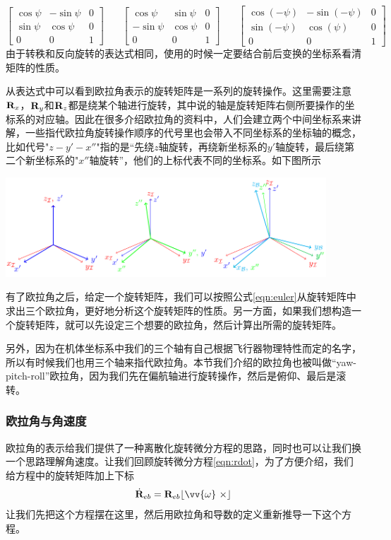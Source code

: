 \documentclass[11pt]{article}
\begin{document}
$$
\begin{bmatrix}
\cos\psi & - \sin\psi & 0\\
\sin\psi & \cos\psi & 0\\
0 & 0 & 1
\end{bmatrix}
\ \ \ \  \ \ \ \
\begin{bmatrix}
\cos\psi & \sin\psi & 0\\
-\sin\psi & \cos\psi & 0\\
0 & 0 & 1
\end{bmatrix} 
\ \ \ \  \ \ \ \
\begin{bmatrix}
\cos(-\psi) & -\sin(-\psi) & 0\\
\sin(-\psi) & \cos(\psi) & 0\\
0 & 0 & 1
\end{bmatrix} 
$$
由于转秩和反向旋转的表达式相同，使用的时候一定要结合前后变换的坐标系看清矩阵的性质。

从表达式中可以看到欧拉角表示的旋转矩阵是一系列的旋转操作。这里需要注意${\bf R}_x$，${\bf R}_y$和${\bf R}_z$都是绕某个轴进行旋转，其中说的轴是旋转矩阵右侧所要操作的坐标系的对应轴。因此在很多介绍欧拉角的资料中，人们会建立两个中间坐标系来讲解，一些指代欧拉角旋转操作顺序的代号里也会带入不同坐标系的坐标轴的概念，比如代号"$z-y'-x''$"指的是“先绕$z$轴旋转，再绕新坐标系的$y'$轴旋转，最后绕第二个新坐标系的"$x''$轴旋转”，他们的上标代表不同的坐标系。如下图所示

\begin{center}
\includegraphics[width=0.9\textwidth]{images/euler.png}
\end{center}

有了欧拉角之后，给定一个旋转矩阵，我们可以按照公式\ref{eqn:euler}从旋转矩阵中求出三个欧拉角，更好地分析这个旋转矩阵的性质。另一方面，如果我们想构造一个旋转矩阵，就可以先设定三个想要的欧拉角，然后计算出所需的旋转矩阵。

另外，因为在机体坐标系中我们的三个轴有自己根据飞行器物理特性而定的名字，所以有时候我们也用三个轴来指代欧拉角。本节我们介绍的欧拉角也被叫做“yaw-pitch-roll”欧拉角，因为我们先在偏航轴进行旋转操作，然后是俯仰、最后是滚转。

\subsubsection{欧拉角与角速度}\label{sec:eulerandangular}
欧拉角的表示给我们提供了一种离散化旋转微分方程的思路，同时也可以让我们换一个思路理解角速度。让我们回顾旋转微分方程\ref{eqn:rdot}，为了方便介绍，我们给方程中的旋转矩阵加上下标
$$
\dot{{\bf R}}_{eb} = {\bf R}_{eb}\lfloor \vv{\omega} \ \times \rfloor
$$
让我们先把这个方程摆在这里，然后用欧拉角和导数的定义重新推导一下这个方程。
\end{document}
